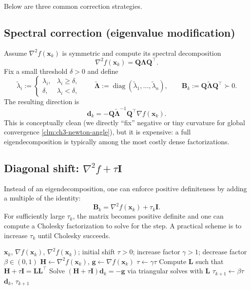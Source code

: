 Below are three common correction strategies.

\subsection{Spectral correction (eigenvalue modification)}
Assume $\nabla^2 f(\mathbf{x}_k)$ is symmetric and compute its spectral
decomposition
\[
  \nabla^2 f(\mathbf{x}_k)=\mathbf{Q}\boldsymbol{\Lambda}\mathbf{Q}^\top.
\]
Fix a small threshold $\delta>0$ and define
\[
  \tilde\lambda_i :=
  \begin{cases}
    \lambda_i, & \lambda_i\ge \delta,\\
    \delta, & \lambda_i<\delta,
  \end{cases}
  \qquad
  \tilde{\boldsymbol{\Lambda}}:=\operatorname{diag}(\tilde\lambda_1,\dots,\tilde\lambda_n),
  \qquad
  \mathbf{B}_k:=\mathbf{Q}\tilde{\boldsymbol{\Lambda}}\mathbf{Q}^\top\succ 0.
\]
The resulting direction is
\[
  \mathbf{d}_k = -\mathbf{Q}\tilde{\boldsymbol{\Lambda}}^{-1}\mathbf{Q}^\top \nabla f(\mathbf{x}_k).
\]
This is conceptually clean (we directly ``fix'' negative or tiny curvature for
global convergence \cref{clm:ch3-newton-angle}), but
it is expensive: a full eigendecomposition is typically among the most costly
dense factorizations.

\subsection{Diagonal shift: \texorpdfstring{$\nabla^2 f+\tau \mathbf{I}$}{H + tau I}}
Instead of an eigendecomposition, one can enforce positive definiteness by
adding a multiple of the identity:
\[
  \mathbf{B}_k=\nabla^2 f(\mathbf{x}_k)+\tau_k \mathbf{I}.
\]
For sufficiently large $\tau_k$, the matrix becomes positive definite and one
can compute a Cholesky factorization to solve for the step. A practical scheme
is to increase $\tau_k$ until Cholesky succeeds.

\begin{algorithm}[ht]
  \caption{\textsc{Diagonal shift} for a nonconvex Newton step}
  \label{alg:ch3-diagonal-shift}
  \begin{algorithmic}
    \REQUIRE $\mathbf{x}_k$, $\nabla f(\mathbf{x}_k)$, $\nabla^2 f(\mathbf{x}_k)$; initial shift $\tau>0$; increase factor $\gamma>1$; decrease factor $\beta\in(0,1)$
    \STATE $\mathbf{H}\gets \nabla^2 f(\mathbf{x}_k)$, $\mathbf{g}\gets \nabla f(\mathbf{x}_k)$
      \STATE $\tau\gets \gamma \tau$
    \ENDWHILE
    \STATE Compute $\mathbf{L}$ such that $\mathbf{H}+\tau\mathbf{I}=\mathbf{L}\mathbf{L}^\top$
    \STATE Solve $(\mathbf{H}+\tau\mathbf{I})\mathbf{d}_k=-\mathbf{g}$ via triangular solves with $\mathbf{L}$
    \STATE $\tau_{k+1}\gets \beta \tau$
    \RETURN $\mathbf{d}_k$, $\tau_{k+1}$
  \end{algorithmic}
\end{algorithm}

